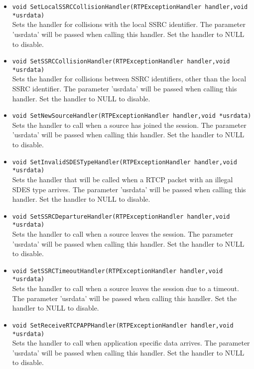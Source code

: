 \begin{itemize}
\item {\tt void SetLocalSSRCCollisionHandler(RTPExceptionHandler handler,void *usrdata)}\\
	Sets the handler for collisions with the local SSRC identifier. The
	parameter 'usrdata' will be passed when calling this handler. Set the
	handler to NULL to disable.

\item {\tt void SetSSRCCollisionHandler(RTPExceptionHandler handler,void *usrdata)}\\
	Sets the handler for collisions between SSRC identifiers, other than
	the local SSRC identifier. The parameter 'usrdata' will be passed
	when calling this handler. Set the handler to NULL to disable.

\item {\tt void SetNewSourceHandler(RTPExceptionHandler handler,void *usrdata)}\\
	Sets the handler to call when a source has joined the session. The
	parameter 'usrdata' will be passed when calling this handler. Set the
	handler to NULL to disable.

\item {\tt void SetInvalidSDESTypeHandler(RTPExceptionHandler handler,void *usrdata)}\\
	Sets the handler that will be called when a RTCP packet with an illegal
	SDES type arrives. The parameter 'usrdata' will be passed when calling
	this handler. Set the handler to NULL to disable.

\item {\tt void SetSSRCDepartureHandler(RTPExceptionHandler handler,void *usrdata)}\\
	Sets the handler to call when a source leaves the session. The
	parameter 'usrdata' will be passed when calling this handler. Set the
	handler to NULL to disable.
	
\item {\tt void SetSSRCTimeoutHandler(RTPExceptionHandler handler,void *usrdata)}\\
	Sets the handler to call when a source leaves the session due to a
	timeout. The parameter 'usrdata' will be passed when calling this
	handler. Set the handler to NULL to disable.

\item {\tt void SetReceiveRTCPAPPHandler(RTPExceptionHandler handler,void *usrdata)}\\
	Sets the handler to call when application specific data arrives. The
	parameter 'usrdata' will be passed when calling this handler. Set the
	handler to NULL to disable.


\end{itemize}
